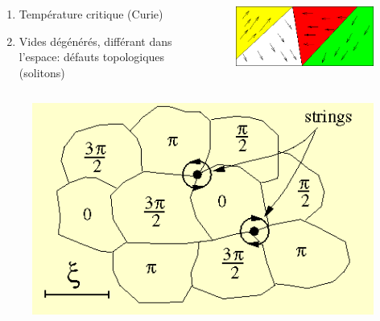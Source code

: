 \documentclass[handout]{beamer}
\begin{document}
\begin{frame}
\begin{columns}[T]
\begin{column}[T]{.5\linewidth}
    \begin{enumerate}
    \item Température critique (Curie)
    \item Vides dégénérés, différant dans l'espace: défauts topologiques (solitons)
    \end{enumerate}
    \end{column}
	\begin{column}[T]{.5\linewidth}
    \begin{figure}[0.3\textwidth]
    \includegraphics[scale=0.4]{murs.png}
    \end{figure}
 
	\end{column}
	
\end{columns}
\begin{figure}[0.3\textwidth]
    \includegraphics[scale=0.3]{string.png}
    \end{figure}
 

\end{frame}
\end{document}
